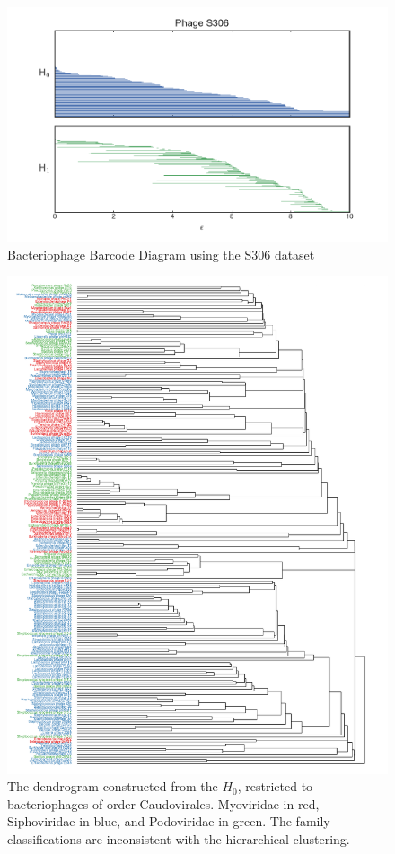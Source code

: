 \begin{figure}
\centering
\includegraphics[]{./fig/phage/phage_s306_barcode.pdf}
\caption[S306 Bacteriophage Barcode Diagram]{Bacteriophage Barcode Diagram using the S306 dataset}
\label{phage:fig:barcode}
\end{figure}

\begin{figure}
\centering
\includegraphics[width=.9\textwidth]{fig/phage/phage_s306_caudosubset_dendrogram.pdf}
\caption[Caudovirales $H_0$ dendrogram]{The dendrogram constructed from the $H_0$, restricted to bacteriophages of order Caudovirales. Myoviridae in red, Siphoviridae in blue, and Podoviridae in green. The family classifications are inconsistent with the hierarchical clustering.}
\label{phage:fig:caudosubset_dendrogram}
\end{figure}

